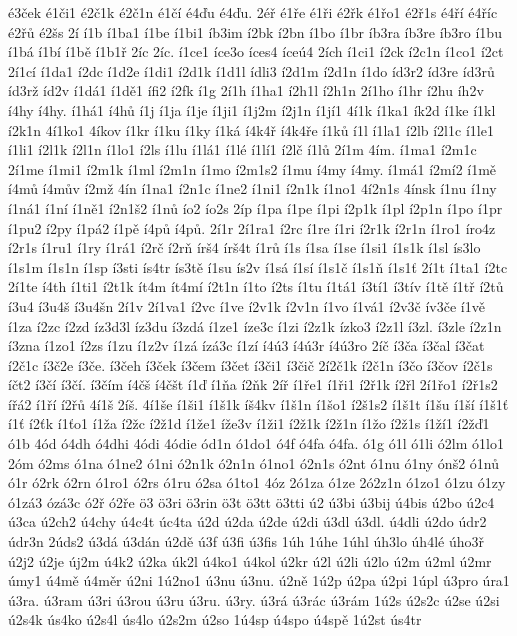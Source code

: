 é3ček
é1či1
é2č1k
é2č1n
é1čí
é4ďu
é4ďu.
2éř
é1ře
é1ři
é2řk
é1řo1
é2ř1s
é4ří
é4říc
é2řů
é2šs
2í
í1b
í1ba1
í1be
í1bi1
íb3im
í2bk
í2bn
í1bo
í1br
íb3ra
íb3re
íb3ro
í1bu
í1bá
í1bí
í1bě
í1b1ř
2íc
2íc.
í1ce1
íce3o
íces4
íceú4
2ích
í1ci1
í2ck
í2c1n
í1co1
í2ct
2í1cí
í1da1
í2dc
í1d2e
í1di1
í2d1k
í1d1l
ídli3
í2d1m
í2d1n
í1do
íd3r2
íd3re
íd3rů
íd3rž
íd2v
í1dá1
í1dě1
ífi2
í2fk
í1g
2í1h
í1ha1
í2h1l
í2h1n
2í1ho
í1hr
í2hu
íh2v
í4hy
í4hy.
í1há1
í4hů
í1j
í1ja
í1je
í1ji1
í1j2m
í2j1n
í1jí1
4í1k
í1ka1
ík2d
í1ke
í1kl
í2k1n
4í1ko1
4íkov
í1kr
í1ku
í1ky
í1ká
í4k4ř
í4k4ře
í1ků
í1l
í1la1
í2lb
í2l1c
í1le1
í1li1
í2l1k
í2l1n
í1lo1
í2ls
í1lu
í1lá1
í1lé
í1lí1
í2lč
í1lů
2í1m
4ím.
í1ma1
í2m1c
2í1me
í1mi1
í2m1k
í1ml
í2m1n
í1mo
í2m1s2
í1mu
í4my
í4my.
í1má1
í2mí2
í1mě
í4mů
í4mův
í2mž
4ín
í1na1
í2n1c
í1ne2
í1ni1
í2n1k
í1no1
4í2n1s
4ínsk
í1nu
í1ny
í1ná1
í1ní
í1ně1
í2n1š2
í1nů
ío2
ío2s
2íp
í1pa
í1pe
í1pi
í2p1k
í1pl
í2p1n
í1po
í1pr
í1pu2
í2py
í1pá2
í1pě
í4pů
í4pů.
2í1r
2í1ra1
í2rc
í1re
í1ri
í2r1k
í2r1n
í1ro1
íro4z
í2r1s
í1ru1
í1ry
í1rá1
í2rč
í2rň
írš4
írš4t
í1rů
í1s
í1sa
í1se
í1si1
í1s1k
í1sl
ís3lo
í1s1m
í1s1n
í1sp
í3sti
ís4tr
ís3tě
í1su
ís2v
í1sá
í1sí
í1s1č
í1s1ň
í1s1ť
2í1t
í1ta1
í2tc
2í1te
í4th
í1ti1
í2t1k
ít4m
ít4mí
í2t1n
í1to
í2ts
í1tu
í1tá1
í3tí1
í3tív
í1tě
í1tř
í2tů
í3u4
í3u4š
í3u4šn
2í1v
2í1va1
í2vc
í1ve
í2v1k
í2v1n
í1vo
í1vá1
í2v3č
ív3če
í1vě
í1za
í2zc
í2zd
íz3d3l
íz3du
í3zdá
í1ze1
íze3c
í1zi
í2z1k
ízko3
í2z1l
í3zl.
í3zle
í2z1n
í3zna
í1zo1
í2zs
í1zu
í1z2v
í1zá
ízá3c
í1zí
í4ú3
í4ú3r
í4ú3ro
2íč
í3ča
í3čal
í3čat
í2č1c
í3č2e
í3če.
í3čeh
í3ček
í3čem
í3čet
í3či1
í3čič
2í2č1k
í2č1n
í3čo
í3čov
í2č1s
íčt2
í3čí
í3čí.
í3čím
í4čš
í4čšt
í1ď
í1ňa
í2ňk
2íř
í1ře1
í1ři1
í2ř1k
í2řl
2í1řo1
í2ř1s2
ířá2
í1ří
í2řů
4í1š
2íš.
4í1še
í1ši1
í1š1k
íš4kv
í1š1n
í1šo1
í2š1s2
í1š1t
í1šu
í1ší
í1š1ť
í1ť
í2ťk
í1ťo1
í1ža
í2žc
í2ž1d
í1že1
íže3v
í1ži1
í2ž1k
í2ž1n
í1žo
í2ž1s
í1ží1
í2žď1
ó1b
4ód
ó4dh
ó4dhi
4ódi
4ódie
ód1n
ó1do1
ó4f
ó4fa
ó4fa.
ó1g
ó1l
ó1li
ó2lm
ó1lo1
2óm
ó2ms
ó1na
ó1ne2
ó1ni
ó2n1k
ó2n1n
ó1no1
ó2n1s
ó2nt
ó1nu
ó1ny
ónš2
ó1nů
ó1r
ó2rk
ó2rn
ó1ro1
ó2rs
ó1ru
ó2sa
ó1to1
4óz
2ó1za
ó1ze
2ó2z1n
ó1zo1
ó1zu
ó1zy
ó1zá3
ózá3c
ó2ř
ó2ře
ö3
ö3ri
ö3rin
ö3t
ö3tt
ö3tti
ú2
ú3bi
ú3bij
ú4bis
ú2bo
ú2c4
ú3ca
ú2ch2
ú4chy
ú4c4t
úc4ta
ú2d
ú2da
ú2de
ú2di
ú3dl
ú3dl.
ú4dli
ú2do
údr2
údr3n
2úds2
ú3dá
ú3dán
ú2dě
ú3f
ú3fi
ú3fis
1úh
1úhe
1úhl
úh3lo
úh4lé
úho3ř
ú2j2
ú2je
új2m
ú4k2
ú2ka
úk2l
ú4ko1
ú4kol
ú2kr
ú2l
ú2li
ú2lo
ú2m
ú2ml
ú2mr
úmy1
ú4mě
ú4měr
ú2ni
1ú2no1
ú3nu
ú3nu.
ú2ně
1ú2p
ú2pa
ú2pi
1úpl
ú3pro
úra1
ú3ra.
ú3ram
ú3ri
ú3rou
ú3ru
ú3ru.
ú3ry.
ú3rá
ú3rác
ú3rám
1ú2s
ú2s2c
ú2se
ú2si
ú2s4k
ús4ko
ú2s4l
ús4lo
ú2s2m
ú2so
1ú4sp
ú4spo
ú4spě
1ú2st
ús4tr
